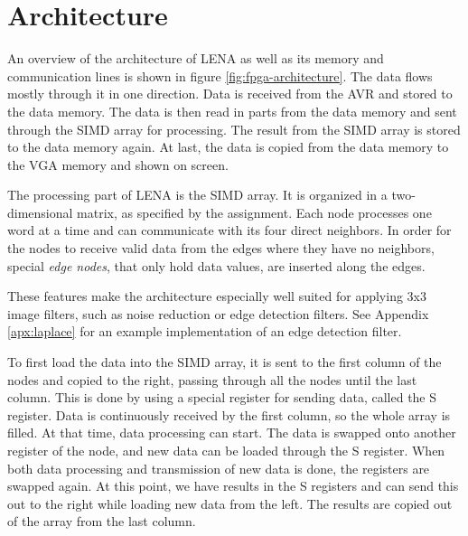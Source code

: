 \section{Architecture}



An overview of the architecture of \ac{LENA} as well as its memory and
communication lines is shown in figure \ref{fig:fpga-architecture}. The data
flows mostly through it in one direction. Data is received from the AVR and
stored to the data memory. The data is then read in parts from the data memory
and sent through the \ac{SIMD} array for processing. The result from the
\ac{SIMD} array is stored to the data memory again.  At last, the data is copied
from the data memory to the \ac{VGA} memory and shown on screen.

The processing part of \ac{LENA} is the \ac{SIMD} array. It is organized
in a two-dimensional matrix, as specified by the assignment. Each node
processes one word at a time and can communicate with its four direct
neighbors. In order for the nodes to receive valid data from the edges
where they have no neighbors, special \emph{edge nodes}, that only hold
data values, are inserted along the edges.

These features make the architecture especially well suited for applying
3x3 image filters, such as noise reduction or edge detection filters.
See Appendix \ref{apx:laplace} for an example implementation of an edge
detection filter. 

To first load the data into the \ac{SIMD} array, it is sent to the first column
of the nodes and copied to the right, passing through all the nodes until the
last column.  This is done by using a special register for sending data, called
the S register. Data is continuously
received by the first column, so the whole array is filled. At that time, data
processing can start. The data is swapped onto another register of the node, and
new data can be loaded through the S register.  When both data processing and
transmission of new data is done, the registers are swapped again. At this
point, we have results in the S registers and can send this out to the right
while loading new data from the left. The results are copied out of the array
from the last column.

